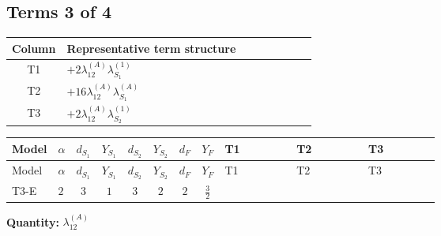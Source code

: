 \documentclass[8pt]{article}
\begin{document}
\begin{landscape}
\subsection*{Terms 3 of 4}
\begin{center}
\begin{tabular}{@{}c >{\raggedright\arraybackslash}p{0.82\linewidth}@{}}
\toprule
Column & Representative term structure \\
\midrule
T1 & \(\displaystyle +2 {\lambda_{12}^{(A)}} {\lambda_{S_1}^{(1)}}\) \\
\midrule
T2 & \(\displaystyle +16 {\lambda_{12}^{(A)}} {\lambda_{S_1}^{(A)}}\) \\
\midrule
T3 & \(\displaystyle +2 {\lambda_{12}^{(A)}} {\lambda_{S_2}^{(1)}}\) \\
\midrule
\bottomrule
\end{tabular}
\end{center}
\smallskip
\tiny
\begin{longtable}{@{}llcccccc >{\raggedright\arraybackslash}p{0.21\linewidth} >{\raggedright\arraybackslash}p{0.21\linewidth} >{\raggedright\arraybackslash}p{0.21\linewidth}@{}}
\toprule
Model & $\alpha$ & $d_{S_1}$ & $Y_{S_1}$ & $d_{S_2}$ & $Y_{S_2}$ & $d_F$ & $Y_F$ & T1 & T2 & T3 \\
\midrule
\endfirsthead
\toprule
Model & $\alpha$ & $d_{S_1}$ & $Y_{S_1}$ & $d_{S_2}$ & $Y_{S_2}$ & $d_F$ & $Y_F$ & T1 & T2 & T3 \\
\midrule
\endhead
T3-E & $2$ & $3$ & $1$ & $3$ & $2$ & $2$ & $\frac{3}{2}$ & \scriptsize\adjustbox{max width=\linewidth}{$\begin{gathered} +2 {\lambda_{12}^{(A)}} {\lambda_{S_1}^{(1)}}\end{gathered}$} & \scriptsize\adjustbox{max width=\linewidth}{$\begin{gathered} +16 {\lambda_{12}^{(A)}} {\lambda_{S_1}^{(A)}}\end{gathered}$} & \scriptsize\adjustbox{max width=\linewidth}{$\begin{gathered} +2 {\lambda_{12}^{(A)}} {\lambda_{S_2}^{(1)}}\end{gathered}$} \\
\midrule
\bottomrule
\end{longtable}
\clearpage
\noindent\textbf{Quantity: }$\lambda_{12}^{(A)}$\par\smallskip

\end{landscape}
\end{document}
